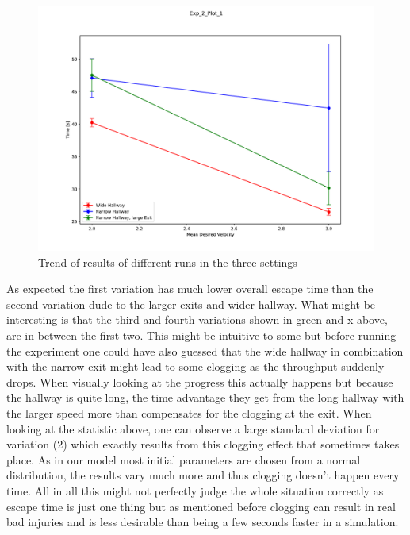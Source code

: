 \documentclass[11pt]{article}
\begin{document}
\begin{figure}[H]
	\centering
	\includegraphics[width=1\linewidth]{assets/Exp_2_Plot_1}\\
	Trend of results of different runs in the three settings
\end{figure}

As expected the first variation has much lower overall escape time than the second variation dude to the larger exits and wider hallway. What might be interesting is that the third and fourth variations shown in green and x above, are in between the first two. This might be intuitive to some but before running the experiment one could have also guessed that the wide hallway in combination with the narrow exit might lead to some clogging as the throughput suddenly drops. When visually looking at the progress this actually happens but because the hallway is quite long, the time advantage they get from the long hallway with the larger speed more than compensates for the clogging at the exit. When looking at the statistic above, one can observe a large standard deviation for variation (2) which exactly results from this clogging effect that sometimes takes place. As in our model most initial parameters are chosen from a normal distribution, the results vary much more and thus clogging doesn't happen every time. All in all this might not perfectly judge the whole situation correctly as escape time is just one thing but as mentioned before clogging can result in real bad injuries and is less desirable than being a few seconds faster in a simulation.
\end{document}
